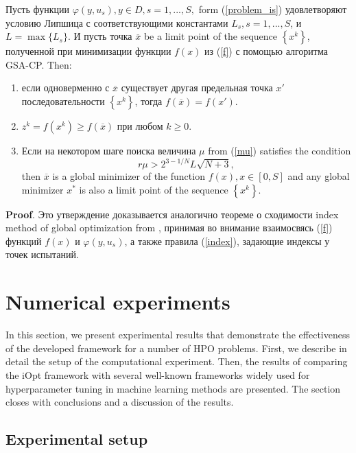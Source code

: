 \documentclass[preprint,12pt]{elsarticle}
\begin{document}
Пусть функции $ \varphi(y,u_s), y \in D, s = 1,...,S,$ form (\ref{problem_is}) удовлетворяют условию Липшица с соответствующими константами $L_s, s = 1,...,S$, и $L = \max\{L_s\}$.
И пусть точка $\overline{x}$ be a limit point of the sequence $\left\{x^k\right\} $, полученной при минимизации функции $f(x)$ из (\ref{f}) с помощью алгоритма GSA-CP. Then:
\begin{enumerate}
	\item 
	если одноверменно с $\overline{x}$ существует другая предельная точка $x'$ последовательности $\left\{x^k\right\}$, тогда $f(\overline{x}) = f(x')$.
	\item
	$z^k=f(x^k) \geq f(\overline{x})$ при любом $k \geq 0$.
	\item
	Если на некотором шаге поиска величина $\mu$ from (\ref{mu}) satisfies the condition
\begin{equation}\label{217}
  r \mu > 2^{3-1/N} L \sqrt{N+3},
\end{equation}
then $\overline{x}$ is a global minimizer of the function $f(x), x\in[0,S]$ and any global minimizer $x^\ast$ is also a limit point of the sequence $\left\{x^k\right\}$.
\end{enumerate}

\textbf{Proof}. Это утверждение доказывается аналогично теореме о сходимости index method of global optimization from \cite{Strongin2000}, принимая во внимание взаимосвясь (\ref{f}) функций  $f(x)$ и $\varphi(y,u_s)$, а также правила (\ref{index}), задающие индексы у точек испытаний.



 

\section{Numerical experiments}
\label{sec_exp}

In this section, we present experimental results that demonstrate the effectiveness of the developed framework for a number of HPO problems. First, we describe in detail the setup of the computational experiment. Then, the results of comparing the iOpt framework with several well-known frameworks widely used for hyperparameter tuning in machine learning methods are presented. The section closes with conclusions and a discussion of the results.

\subsection{Experimental setup}
\label{sec_setup}
\end{document}
